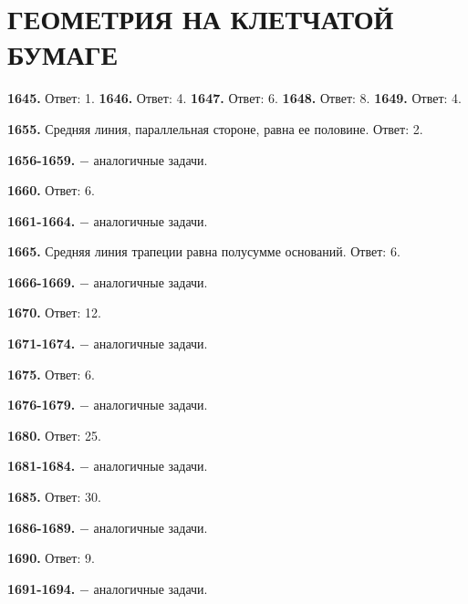 \section{ГЕОМЕТРИЯ НА КЛЕТЧАТОЙ БУМАГЕ}

\textbf{1645.}  Ответ: 1.  \textbf{1646.}  Ответ: 4. \textbf{1647.}  Ответ: 6.  \textbf{1648.}  Ответ: 8. 
\textbf{1649.}  Ответ: 4.    
  
\textbf{1655.}  Средняя линия, параллельная стороне, равна ее половине.   Ответ: 2. 

\textbf{1656-1659.} $-$ аналогичные задачи. 

\textbf{1660.}  Ответ: 6.   

\textbf{1661-1664.} $-$ аналогичные задачи. 

\textbf{1665.}  Средняя линия трапеции равна полусумме оснований.  \newline Ответ: 6.

\textbf{1666-1669.}  $-$ аналогичные задачи. 

\textbf{1670.}  Ответ: 12.   

\textbf{1671-1674.}  $-$ аналогичные задачи. 

\textbf{1675.}  Ответ: 6.   

\textbf{1676-1679.}  $-$ аналогичные задачи. 

\textbf{1680.}  Ответ: 25.   

\textbf{1681-1684.}  $-$ аналогичные задачи. 

\textbf{1685.}  Ответ: 30.   

\textbf{1686-1689.}  $-$ аналогичные задачи. 

\textbf{1690.}  Ответ: 9.   

\textbf{1691-1694.}  $-$ аналогичные задачи. 